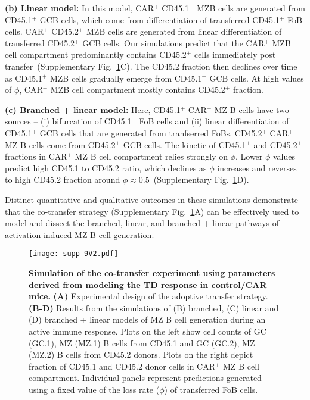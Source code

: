 \documentclass[11pt]{article}
\begin{document}
\textbf{(b) Linear model:}
In this model, CAR$^{+}$ CD45.1$^{+}$ MZB cells are generated from CD45.1$^{+}$ GCB cells, which come from differentiation of transferred CD45.1$^{+}$ FoB cells. 
CAR$^{+}$ CD45.2$^{+}$ MZB cells are generated from linear differentiation of transferred CD45.2$^{+}$ GCB cells.
Our simulations predict that the CAR$^{+}$ MZB cell compartment predominantly contains CD45.2$^{+}$ cells immediately post transfer~(Supplementary Fig.~\ref{fig:co-transf}C).
The CD45.2 fraction then declines over time as CD45.1$^{+}$ MZB cells gradually emerge from CD45.1$^{+}$ GCB cells.
At high values of $\phi$, CAR$^{+}$ MZB cell compartment mostly contains CD45.2$^{+}$ fraction. 

\textbf{(c) Branched + linear model:}
Here, CD45.1$^{+}$ CAR$^{+}$ MZ B cells have two sources -- (i) bifurcation of CD45.1$^{+}$ FoB cells and (ii) linear differentiation of CD45.1$^{+}$ GCB cells that are generated from tranfserred FoBs. 
CD45.2$^{+}$ CAR$^{+}$  MZ B cells come from CD45.2$^{+}$ GCB cells.
The kinetic of CD45.1$^{+}$ and CD45.2$^{+}$ fractions in CAR$^{+}$ MZ B cell compartment relies strongly on $\phi$.
Lower $\phi$ values predict high CD45.1 to CD45.2 ratio, which declines as $\phi$ increases and reverses to high CD45.2 fraction around $\phi \approx 0.5$~(Supplementary Fig.~\ref{fig:co-transf}D).

Distinct quantitative and qualitative outcomes in these simulations demonstrate that the co-transfer strategy (Supplementary Fig.~\ref{fig:co-transf}A) can be effectively used to model and dissect the branched, linear, and branched + linear pathways of activation induced MZ B cell generation.

 
 
\clearpage


\begin{figure}[htbp]
\center
\texttt{[image: supp-9V2.pdf]}
\caption{
    \textbf{Simulation of the co-transfer experiment using parameters derived from modeling the TD response in control/CAR mice.}
    \textbf{(A)} Experimental design of the adoptive transfer strategy.
    \textbf{(B-D)} Results from the simulations of (B) branched, (C) linear and (D) branched + linear models of MZ B cell generation during an active immune response.
    Plots on the left  show cell counts of GC (GC.1), MZ (MZ.1) B cells from CD45.1 and GC (GC.2), MZ (MZ.2) B cells from CD45.2 donors.
    Plots on the right depict fraction of CD45.1 and CD45.2 donor cells in CAR$^+$ MZ B cell compartment.
    Individual panels represent predictions generated using a fixed value of the loss rate ($\phi$) of transferred FoB cells.
    }
       \label{fig:co-transf}
 \end{figure}
 
\end{document}
